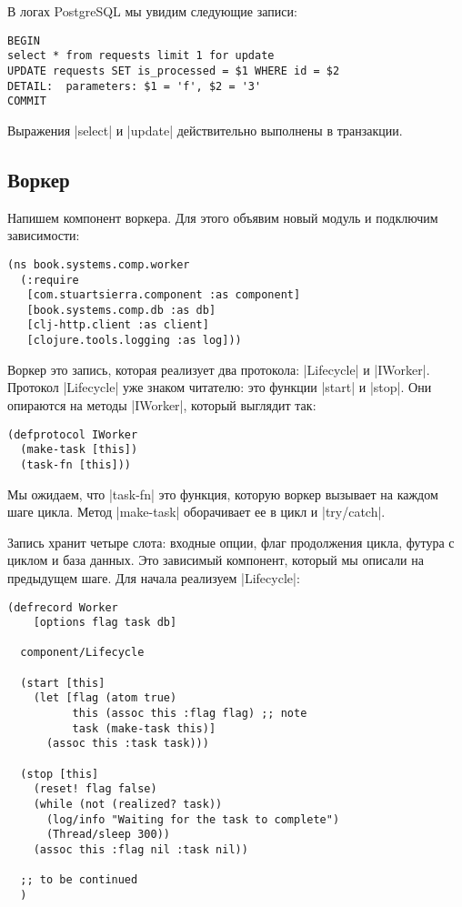 В логах PostgreSQL мы увидим следующие записи:

\begin{verbatim}
BEGIN
select * from requests limit 1 for update
UPDATE requests SET is_processed = $1 WHERE id = $2
DETAIL:  parameters: $1 = 'f', $2 = '3'
COMMIT
\end{verbatim}

Выражения \spverb|select| и \spverb|update| действительно выполнены в транзакции.

\subsection{Воркер}

Напишем компонент воркера. Для этого объявим новый модуль и подключим
зависимости:

\begin{verbatim}
(ns book.systems.comp.worker
  (:require
   [com.stuartsierra.component :as component]
   [book.systems.comp.db :as db]
   [clj-http.client :as client]
   [clojure.tools.logging :as log]))
\end{verbatim}

Воркер это запись, которая реализует два протокола: \spverb|Lifecycle| и
\spverb|IWorker|. Протокол \spverb|Lifecycle| уже знаком читателю: это функции \spverb|start| и
\spverb|stop|. Они опираются на методы \spverb|IWorker|, который выглядит так:

\begin{verbatim}
(defprotocol IWorker
  (make-task [this])
  (task-fn [this]))
\end{verbatim}

Мы ожидаем, что \spverb|task-fn| это функция, которую воркер вызывает на каждом шаге
цикла. Метод \spverb|make-task| оборачивает ее в цикл и \spverb|try/catch|.

Запись хранит четыре слота: входные опции, флаг продолжения цикла, футура с
циклом и база данных. Это зависимый компонент, который мы описали на предыдущем
шаге. Для начала реализуем \spverb|Lifecycle|:

\begin{verbatim}
(defrecord Worker
    [options flag task db]

  component/Lifecycle

  (start [this]
    (let [flag (atom true)
          this (assoc this :flag flag) ;; note
          task (make-task this)]
      (assoc this :task task)))

  (stop [this]
    (reset! flag false)
    (while (not (realized? task))
      (log/info "Waiting for the task to complete")
      (Thread/sleep 300))
    (assoc this :flag nil :task nil))

  ;; to be continued
  )
\end{verbatim}

